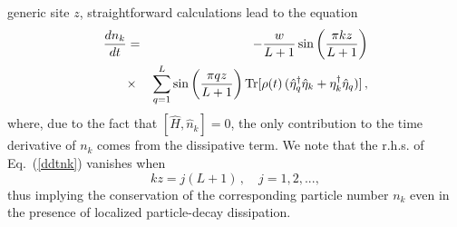   generic site $z$, straightforward calculations lead to the equation
  \begin{eqnarray}
    {d n_k\over dt} &=&
  - {w\over L+1} \sin\left({\pi k z \over L+1}\right)
  \label{ddtnk} \\
  &\times& \sum_{q=1}^L \sin\left({\pi q z\over L+1}\right)
  {\rm Tr}[\rho(t) \,
  (\hat \eta_q^\dagger \hat \eta_{k} + \eta_k^\dagger \hat \eta_{q})]\,,
  \nonumber
  \end{eqnarray}
  where, due to the fact that $[\hat H,\hat n_k]=0$, the only
  contribution to the time derivative of $n_k$ comes from the
  dissipative term.  We note that the r.h.s. of Eq.~(\ref{ddtnk})
  vanishes when
  \begin{equation}
  k z = j (L+1)\,, \quad j=1,2,...,
  \label{kz}
  \end{equation}
  thus implying the conservation of the corresponding particle number
  $n_k$ even in the presence of localized particle-decay dissipation.
  
